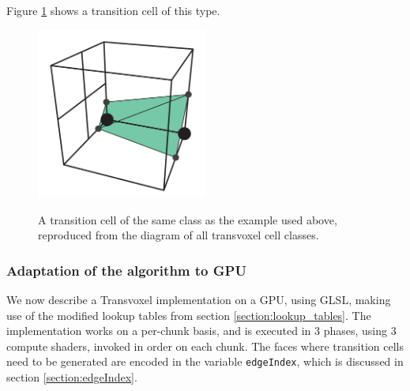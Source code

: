 \documentclass[11pt]{article}
\begin{document}
Figure \ref{fig:transition_cell_example_case} shows a transition cell of this type.
\begin{figure}
  \caption{A transition cell of the same class as the example used above, reproduced from the diagram of all transvoxel cell classes\cite{lengyel}.}
  \includegraphics[width=0.5\textwidth]{transition_cell_example_case.PNG}
  \label{fig:transition_cell_example_case}
\end{figure}

\subsubsection{Adaptation of the algorithm to GPU}

We now describe a Transvoxel implementation on a GPU, using GLSL, making use of the modified lookup tables from section \ref{section:lookup_tables}. The implementation works on a per-chunk basis, and is executed in 3 phases, using 3 compute shaders, invoked in order on each chunk. The faces where transition cells need to be generated are encoded in the variable \texttt{edgeIndex}, which is discussed in section \ref{section:edgeIndex}.
\end{document}
